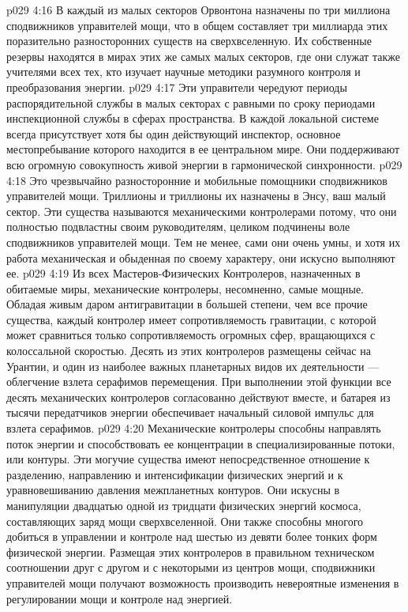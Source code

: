 \vs p029 4:16 В каждый из малых секторов Орвонтона назначены по три миллиона сподвижников управителей мощи, что в общем составляет три миллиарда этих поразительно разносторонних существ на сверхвселенную. Их собственные резервы находятся в мирах этих же самых малых секторов, где они служат также учителями всех тех, кто изучает научные методики разумного контроля и преобразования энергии.
\vs p029 4:17 Эти управители чередуют периоды распорядительной службы в малых секторах с равными по сроку периодами инспекционной службы в сферах пространства. В каждой локальной системе всегда присутствует хотя бы один действующий инспектор, основное местопребывание которого находится в ее центральном мире. Они поддерживают всю огромную совокупность живой энергии в гармонической синхронности.
\vs p029 4:18 \pc {}\bibnobreakspace {} Это чрезвычайно разносторонние и мобильные помощники сподвижников управителей мощи. Триллионы и триллионы их назначены в Энсу, ваш малый сектор. Эти существа называются механическими контролерами потому, что они полностью подвластны своим руководителям, целиком подчинены воле сподвижников управителей мощи. Тем не менее, сами они очень умны, и хотя их работа механическая и обыденная по своему характеру, они искусно выполняют ее.
\vs p029 4:19 Из всех Мастеров\hyp{}Физических Контролеров, назначенных в обитаемые миры, механические контролеры, несомненно, самые мощные. Обладая живым даром антигравитации в большей степени, чем все прочие существа, каждый контролер имеет сопротивляемость гравитации, с которой может сравниться только сопротивляемость огромных сфер, вращающихся с колоссальной скоростью. Десять из этих контролеров размещены сейчас на Урантии, и один из наиболее важных планетарных видов их деятельности --- облегчение взлета серафимов перемещения. При выполнении этой функции все десять механических контролеров согласованно действуют вместе, и батарея из тысячи передатчиков энергии обеспечивает начальный силовой импульс для взлета серафимов.
\vs p029 4:20 Механические контролеры способны направлять поток энергии и способствовать ее концентрации в специализированные потоки, или контуры. Эти могучие существа имеют непосредственное отношение к разделению, направлению и интенсификации физических энергий и к уравновешиванию давления межпланетных контуров. Они искусны в манипуляции двадцатью одной из тридцати физических энергий космоса, составляющих заряд мощи сверхвселенной. Они также способны многого добиться в управлении и контроле над шестью из девяти более тонких форм физической энергии. Размещая этих контролеров в правильном техническом соотношении друг с другом и с некоторыми из центров мощи, сподвижники управителей мощи получают возможность производить невероятные изменения в регулировании мощи и контроле над энергией.
